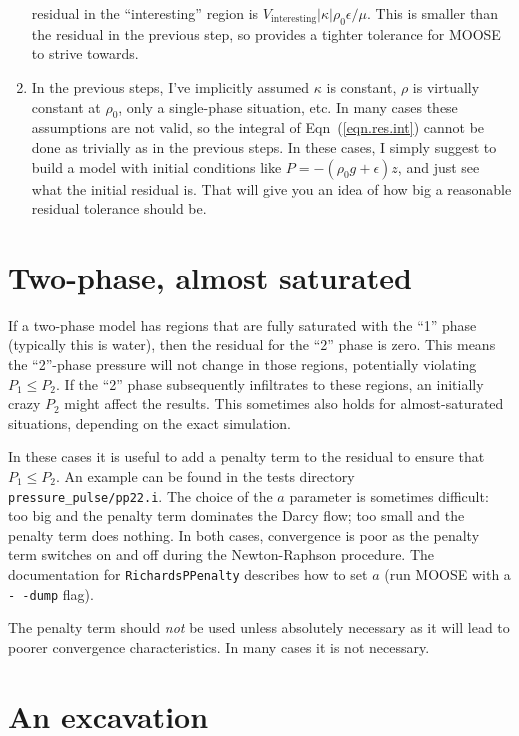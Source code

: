 \documentclass[]{scrreprt}
\begin{document}
\begin{enumerate}
  residual in the ``interesting'' region is
  $V_{\mathrm{interesting}}|\kappa|\rho_{0}\epsilon/\mu$.  This is smaller
  than the residual in the previous step, so provides a tighter
  tolerance for MOOSE to strive towards.
\item In the previous steps, I've implicitly assumed $\kappa$ is
  constant, $\rho$ is virtually constant at $\rho_{0}$, only a
  single-phase situation, etc.  In many cases these assumptions are
  not valid, so the integral of Eqn~(\ref{eqn.res.int}) cannot be done
  as trivially as in the previous steps.  In these cases, I simply
  suggest to build a model with initial conditions like $P =
  -(\rho_{0} g + \epsilon)z$, and just see what the initial residual is.
  That will give you an idea of how big a reasonable residual
  tolerance should be.
\end{enumerate}


\section{Two-phase, almost saturated}

If a two-phase model has regions that are fully saturated with the
``1'' phase (typically this is water), then the residual for the ``2''
phase is zero.  This means the ``2''-phase pressure will not change in
those regions, potentially violating $P_{1}\leq P_{2}$.  If the ``2''
phase subsequently infiltrates to these regions, an initially crazy
$P_{2}$ might affect the results.  This sometimes also holds for
almost-saturated situations, depending on the exact simulation.

In these cases it is useful to add a penalty term to the residual to
ensure that $P_{1}\leq P_{2}$.  An example can be found in the tests
directory {\tt pressure\_pulse/pp22.i}.  The choice of the $a$
parameter is sometimes difficult: too big and the penalty term
dominates the Darcy flow; too small and the penalty term does
nothing.  In both cases, convergence is poor as the penalty term
switches on and off during the Newton-Raphson procedure.  The
documentation for {\tt RichardsPPenalty} describes how to set $a$ (run
MOOSE with a {\tt -\,-dump} flag).

The penalty term should {\em not} be used unless absolutely necessary
as it will lead to poorer convergence characteristics.  In many cases
it is not necessary.

\section{An excavation}
\end{document}
